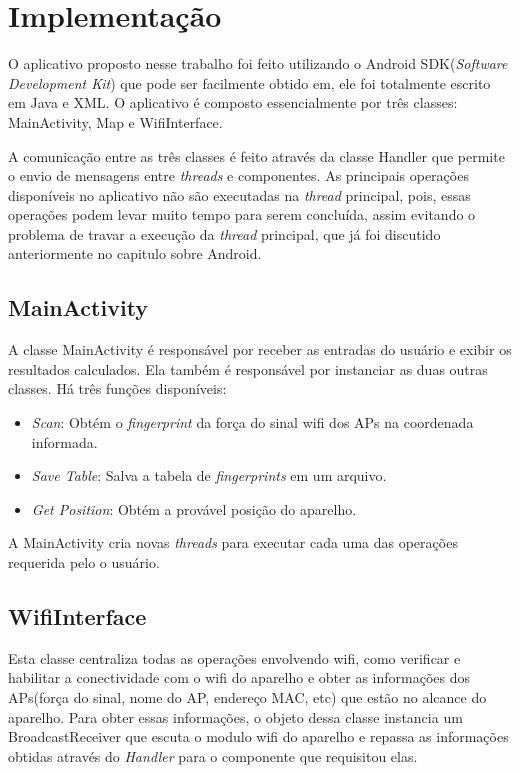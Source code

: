 \chapter{Implementação}	 
\label{implementacao}
  
  O aplicativo proposto nesse trabalho foi feito utilizando o Android SDK(\textit{Software Development Kit}) que pode ser 
  facilmente obtido em\cite{sdk}, 
  ele foi totalmente escrito em Java e XML. O aplicativo é composto essencialmente por três  classes: MainActivity, 
  Map e WifiInterface. 
  
  A comunicação entre as três classes é feito através da classe Handler\cite{handler} que permite o envio de 
  mensagens entre \textit{threads} e componentes. As principais operações disponíveis no aplicativo não 
  são executadas na \textit{thread} principal, pois, essas operações podem levar muito tempo para serem 
  concluída, assim evitando o problema de travar a execução da \textit{thread} principal, 
  que já foi discutido anteriormente no capitulo sobre Android.
  
  \section{MainActivity}
  A classe MainActivity é responsável por receber as entradas do usuário e exibir os resultados calculados.
  Ela também é responsável por instanciar as duas outras classes. Há três funções disponíveis: 
  \begin{itemize}
   \item \textit{Scan}: Obtém o \textit{fingerprint} da força do sinal wifi dos APs na coordenada informada.
   \item \textit{Save Table}: Salva a tabela de \textit{fingerprints} em um arquivo.
   \item \textit{Get Position}: Obtém a provável posição do aparelho. 
  \end{itemize}

  A MainActivity cria novas \textit{threads} para executar cada uma das operações requerida pelo o usuário.
  
  \section{WifiInterface}
  
  Esta classe centraliza todas as operações envolvendo wifi, como verificar e habilitar a conectividade
  com o wifi do aparelho e obter as informações dos APs(força do sinal, nome do AP, endereço MAC, etc) 
  que estão no alcance do aparelho. Para obter essas informações, o objeto dessa classe
  instancia um BroadcastReceiver que escuta o modulo wifi do aparelho e repassa 
  as informações obtidas através do \textit{Handler} para o componente que requisitou elas.
  
